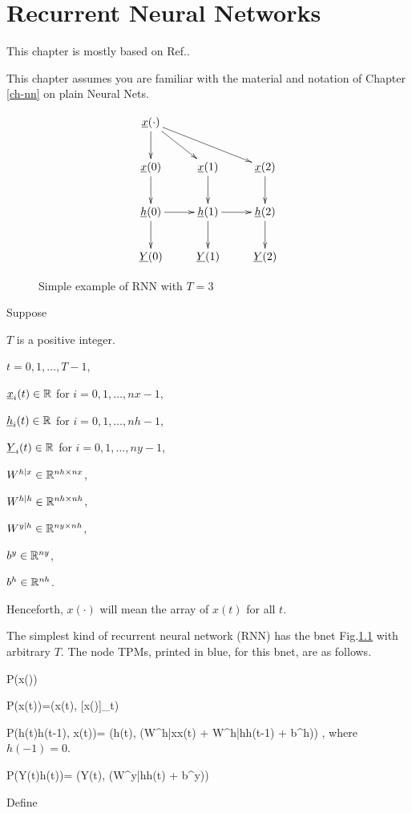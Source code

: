\chapter{Recurrent Neural
 Networks}\label{ch-rnn}

This chapter is mostly
based on Ref.\cite{ng-rnn}.

This chapter
assumes you are
familiar 
with the material
and notation of Chapter \ref{ch-nn}
on plain Neural Nets.


\begin{figure}[h!]
\centering
$$\xymatrix{
\rvx(\cdot)\ar[d]\ar[dr]\ar[drr]\\
\rvx(0)\ar[d]&
\rvx(1)\ar[d]&
\rvx(2)\ar[d]\\
\rvh(0)\ar[d]\ar[r]&
\rvh(1)\ar[d]\ar[r]&
\rvh(2)\ar[d]\\
\rvY(0)&
\rvY(1)&
\rvY(2)
}$$
\caption{Simple example of 
RNN with $T=3$}
\label{fig-rnn}
\end{figure}

Suppose

$T$ is a positive integer.

$t=0, 1, \ldots, T-1$,

$\rvx_i(t)\in \RR$ for
 $i=0,1, \ldots,nx-1$,

$\rvh_i(t)\in \RR$ for
 $i=0,1, \ldots,nh-1$,

$\rvY_i(t)\in \RR$ for
 $i=0,1, \ldots,ny-1$,

$W^{h|x}\in{ \mathbb{R}}^{nh\times nx}$,

$W^{h|h}\in{ \mathbb{R}}^{nh\times nh}$,

$W^{y|h}\in{ \mathbb{R}}^{ny\times nh}$,

$b^y\in { \mathbb{R}}^{ny}$,

$b^h\in { \mathbb{R}}^{nh}$.

Henceforth, $x(\cdot)$ will
mean the array of $x(t)$ for all $t$.

The simplest kind of
recurrent neural network (RNN)
has
the bnet Fig.\ref{fig-rnn}
with arbitrary $T$.
The node
TPMs, printed in
blue, for this bnet, are as follows.

\beq\color{blue}
P(x(\cdot))
\eeq

\beq\color{blue}
P(x(t))=\delta(x(t), [x(\cdot)]_t)
\eeq

\beq\color{blue}
P(h(t)\mid h(t-1), x(t))=
\delta(h(t),
\phi(W^{h|x}x(t) +
 W^{h|h}h(t-1) + b^h))
\;,
\eeq
where
$h(-1)=0$.

\beq\color{blue}
P(Y(t)\mid h(t))=
\delta(Y(t),
\phi(W^{y|h}h(t) + b^y))
\eeq

Define


